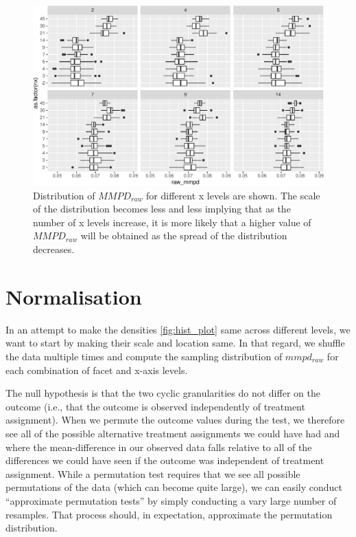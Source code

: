 \documentclass[
]{article}
\begin{document}
\begin{figure}

{\centering \includegraphics[width=\textwidth]{figure/dist-across-x-1} 

}

\caption{Distribution of $MMPD_{raw}$ for different x levels are shown. The scale of the distribution becomes less and less implying that as the number of x levels increase, it is more likely that a higher value of $MMPD_{raw}$ will be obtained as the spread of the distribution decreases. }\label{fig:dist-across-x}
\end{figure}

\hypertarget{normalisation}{%
\section{Normalisation}\label{normalisation}}

In an attempt to make the densities \ref{fig:hist_plot} same across different levels, we want to start by making their scale and location same. In that regard, we shuffle the data multiple times and compute the sampling distribution of \(mmpd_{raw}\) for each combination of facet and x-axis levels.

The null hypothesis is that the two cyclic granularities do not differ on the outcome (i.e., that the outcome is observed independently of treatment assignment). When we permute the outcome values during the test, we therefore see all of the possible alternative treatment assignments we could have had and where the mean-difference in our observed data falls relative to all of the differences we could have seen if the outcome was independent of treatment assignment. While a permutation test requires that we see all possible permutations of the data (which can become quite large), we can easily conduct ``approximate permutation tests'' by simply conducting a vary large number of resamples. That process should, in expectation, approximate the permutation distribution.
\end{document}
